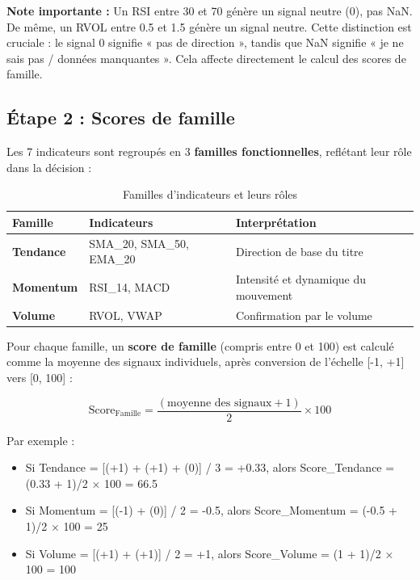 \documentclass{rapportENSIAS} %
\begin{document}
\noindent
\textbf{Note importante :} Un RSI entre 30 et 70 génère un signal neutre (0), pas NaN. De même, un RVOL entre 0.5 et 1.5 génère un signal neutre. Cette distinction est cruciale : le signal 0 signifie « pas de direction », tandis que NaN signifie « je ne sais pas / données manquantes ». Cela affecte directement le calcul des scores de famille.

\subsection{Étape 2 : Scores de famille}

\noindent
Les 7 indicateurs sont regroupés en 3 \textbf{familles fonctionnelles}, reflétant leur rôle dans la décision :

\vspace{0.3cm}
\noindent
\begin{table}[H]
\centering
\begin{tabular}{lll}
\toprule
\textbf{Famille} & \textbf{Indicateurs} & \textbf{Interprétation} \\
\midrule
\textbf{Tendance} & SMA\_20, SMA\_50, EMA\_20 & Direction de base du titre \\
\textbf{Momentum} & RSI\_14, MACD & Intensité et dynamique du mouvement \\
\textbf{Volume} & RVOL, VWAP & Confirmation par le volume \\
\bottomrule
\end{tabular}
\caption{Familles d'indicateurs et leurs rôles}
\label{tab:families}
\end{table}

\noindent
Pour chaque famille, un \textbf{score de famille} (compris entre 0 et 100) est calculé comme la moyenne des signaux individuels, après conversion de l'échelle [-1, +1] vers [0, 100] :

\[
\text{Score}_{\text{Famille}} = \frac{\left(\text{moyenne des signaux} + 1\right)}{2} \times 100
\]

\noindent
Par exemple :
\begin{itemize}
    \item Si Tendance = [(+1) + (+1) + (0)] / 3 = +0.33, alors Score\_Tendance = (0.33 + 1)/2 × 100 = 66.5
    \item Si Momentum = [(-1) + (0)] / 2 = -0.5, alors Score\_Momentum = (-0.5 + 1)/2 × 100 = 25
    \item Si Volume = [(+1) + (+1)] / 2 = +1, alors Score\_Volume = (1 + 1)/2 × 100 = 100
\end{itemize}
\end{document}
